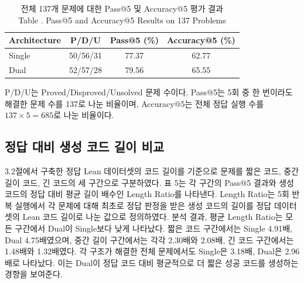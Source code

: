 \documentclass[a4paper,9pt,twocolumn]{extarticle}
\begin{document}
\begin{table}[htbp]\centering\footnotesize
\caption{전체 137개 문제에 대한 Pass@5 및 Accuracy@5 평가 결과\\Table \thetable. Pass@5 and Accuracy@5 Results on 137 Problems}\label{tab:3}
\setlength{\tabcolsep}{3pt}\renewcommand{\arraystretch}{1.2}
\begin{tabularx}{\columnwidth}{>{\raggedright\arraybackslash}Xccc}
\toprule
Architecture & P/D/U & Pass@5 (\%) & Accuracy@5 (\%) \\
\midrule
Single & 50/56/31 & 77.37 & 62.77 \\
Dual & 52/57/28 & 79.56 & 65.55 \\
\bottomrule
\end{tabularx}
\par\vspace{3pt}\begin{minipage}{\columnwidth}\footnotesize
P/D/U는 Proved/Disproved/Unsolved 문제 수이다. Pass@5는 5회 중 한 번이라도 해결한 문제 수를 137로 나눈 비율이며, Accuracy@5는 전체 정답 실행 수를 \(137\times5=685\)로 나눈 비율이다.
\end{minipage}
\end{table}

\subsection{정답 대비 생성 코드 길이 비교 }


3.2절에서 구축한 정답 Lean 데이터셋의 코드 길이를 기준으로 문제를 짧은 코드, 중간 길이 코드, 긴 코드의 세 구간으로 구분하였다. 표 5는 각 구간의 Pass@5 결과와 생성 코드의 정답 대비 평균 길이 배수인 Length Ratio를 나타낸다. Length Ratio는 5회 반복 실행에서 각 문제에 대해 최초로 정답 판정을 받은 생성 코드의 길이를 정답 데이터셋의 Lean 코드 길이로 나눈 값으로 정의하였다. 분석 결과, 평균 Length Ratio는 모든 구간에서 Dual이 Single보다 낮게 나타났다. 짧은 코드 구간에서는 Single 4.91배, Dual 4.75배였으며, 중간 길이 구간에서는 각각 2.30배와 2.08배, 긴 코드 구간에서는 1.48배와 1.32배였다. 각 구조가 해결한 전체 문제에서도 Single은 3.18배, Dual은 2.96배로 나타났다. 이는 Dual이 정답 코드 대비 평균적으로 더 짧은 성공 코드를 생성하는 경향을 보여준다.
\end{document}
